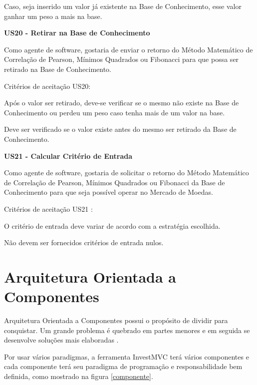 Caso, seja inserido um valor já existente na Base de Conhecimento, esse valor ganhar um peso a mais na base.

\textbf{US20 - Retirar na Base de Conhecimento}

Como agente de software, gostaria de enviar o retorno do Método Matemático de Correlação de Pearson, Mínimos Quadrados ou Fibonacci para que possa ser retirado na Base de Conhecimento.

Critérios de aceitação US20:

Após o valor ser retirado, deve-se verificar se o mesmo não existe na Base de Conhecimento ou perdeu um peso caso tenha mais de um valor na base.

Deve ser verificado se o valor existe antes do mesmo ser retirado da Base de Conhecimento.

\textbf{US21 - Calcular Critério de Entrada}

Como agente de software, gostaria de solicitar o retorno do Método Matemático de Correlação de Pearson, Mínimos Quadrados ou Fibonacci da Base de Conhecimento para que seja possível operar no Mercado de Moedas.

Critérios de aceitação US21 :

O critério de entrada deve variar de acordo com a estratégia escolhida.

Não devem ser fornecidos critérios de entrada nulos.

\section{Arquitetura Orientada a Componentes}

Arquitetura Orientada a Componentes possui o propósito de dividir para conquistar. Um grande problema é quebrado em partes menores e em seguida se desenvolve soluções mais elaboradas \cite{john}.

Por usar vários paradigmas, a ferramenta InvestMVC terá vários componentes e cada componente terá seu paradigma de programação e responsabilidade bem definida, como mostrado na figura \ref{componente}.

